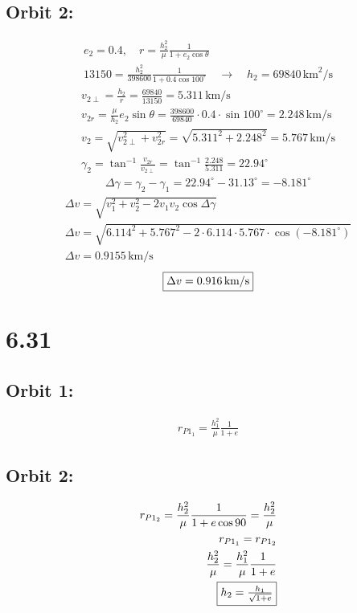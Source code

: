 \documentclass[12 pt]{article}
\begin{document}
\subsection*{Orbit 2:}
\begin{align*}
    e_2 = 0.4, \quad r = \frac{h_2^2}{\mu} \frac{1}{1 + e_2 \cos \theta} \\
    13150 = \frac{h_2^2}{398600} \frac{1}{1 + 0.4 \cos 100^{\circ}} \quad \rightarrow \quad h_2 = 69840 \, \text{km}^2/\text{s}
\end{align*}
\begin{align*}
    v_{2\perp} = \frac{h_2}{r} = \frac{69840}{13150} = 5.311 \, \text{km/s} \\
    v_{2r} = \frac{\mu}{h_2} e_2 \sin \theta = \frac{398600}{69840} \cdot 0.4 \cdot \sin 100^{\circ} = 2.248 \, \text{km/s} \\
    v_2 = \sqrt{v_{2\perp}^2 + v_{2r}^2} = \sqrt{5.311^2 + 2.248^2} = 5.767 \, \text{km/s} \\
    \gamma_2 = \tan^{-1} \frac{v_{2r}}{v_{2\perp}} = \tan^{-1} \frac{2.248}{5.311} = 22.94^{\circ}
\end{align*}
\begin{align*}
    \Delta \gamma = \gamma_2 - \gamma_1 = 22.94^{\circ} - 31.13^{\circ} = -8.181^{\circ}
\end{align*}
\begin{align*}
    \Delta v = \sqrt{v_1^2 + v_2^2 - 2 v_1 v_2 \cos \Delta \gamma} \\
    \Delta v = \sqrt{6.114^2 + 5.767^2 - 2 \cdot 6.114 \cdot 5.767 \cdot \cos(-8.181^{\circ})} \\
    \Delta v = 0.9155 \, \text{km/s}
\end{align*}
\begin{align*}
    \fbox{$\Delta v = 0.916 \, \text{km/s}$}
\end{align*}
\pagebreak

\section*{6.31}
\subsection*{Orbit 1:}
\begin{align*}
    r_{P1_1}=\frac{h_1^2}{\mu}\frac{1}{1+e}
\end{align*}

\subsection*{Orbit 2:}
\begin{align*}
    r_{P1_2}=\frac{h_2^2}{\mu}\frac{1}{1+e\cos{90}}=\frac{h_2^2}{\mu} \\
    r_{P1_1}=r_{P1_2} \\
    \frac{h_2^2}{\mu}=\frac{h_1^2}{\mu}\frac{1}{1+e} \\
    \fbox{$h_2=\frac{h_1}{\sqrt{1+e}}$}
\end{align*}
\pagebreak
\end{document}
